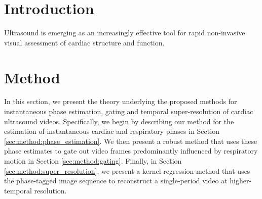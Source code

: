 \documentclass[runningheads,a4paper]{llncs}
\begin{document}
\section{Introduction}
\label{sec:intro}
%
Ultrasound is emerging as an increasingly effective tool for rapid non-invasive visual assessment of cardiac structure and function. 
%

\section{Method}
\label{sec:method}
%
In this section, we present the theory underlying the proposed methods for instantaneous phase estimation, gating and temporal super-resolution of cardiac ultrasound videos. Specifically, we begin by describing our method for the estimation of instantaneous cardiac and respiratory phases in Section \ref{sec:method:phase_estimation}. We then present a robust method that uses these phase estimates to gate out video frames predominantly influenced by respiratory motion in Section \ref{sec:method:gating}. Finally, in Section \ref{sec:method:super_resolution}, we present a kernel regression method that uses the phase-tagged image sequence to reconstruct a single-period video at higher-temporal resolution. 
%
%
\end{document}
